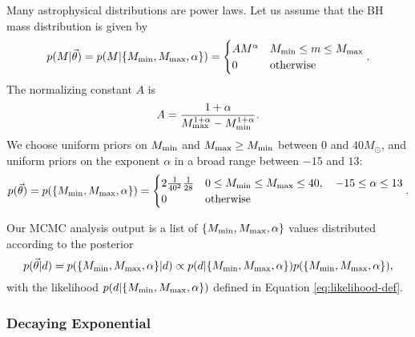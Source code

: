\documentclass[preprint]{aastex}
\newcommand{\Msun}{M_\odot}
\newcommand{\Mmin}{M_{\textnormal{min}}}
\newcommand{\Mmax}{M_{\textnormal{max}}}
\newcommand{\vtheta}{\vec{\theta}}
\begin{document}
Many astrophysical distributions are power laws.  Let us assume that
the BH mass distribution is given by
\begin{equation}
  \label{eq:power-law-dist}
  p(M|\vtheta) = p(M|\{\Mmin, \Mmax, \alpha \}) =
  \begin{cases}
    A M^\alpha & \Mmin \leq m \leq \Mmax \\
    0 & \textnormal{otherwise}
  \end{cases}.
\end{equation}
The normalizing constant $A$ is 
\begin{equation}
  A = \frac{1+\alpha}{\Mmax^{1+\alpha} - \Mmin^{1+\alpha}}.
\end{equation}
We choose uniform priors on $\Mmin$ and $\Mmax \geq \Mmin$ between 0 and
$40 \Msun$, and uniform priors on the exponent $\alpha$ in a broad
range between $-15$ and $13$:
\begin{equation}
  p(\vtheta) = p(\{\Mmin, \Mmax, \alpha\}) = 
  \begin{cases}
    2 \frac{1}{40^2}\frac{1}{28} & 0 \leq \Mmin \leq \Mmax
    \leq 40, \quad -15 \leq \alpha \leq 13 \\
    0 & \textnormal{otherwise}
  \end{cases}.
\end{equation}

Our MCMC analysis output is a list of $\{\Mmin, \Mmax, \alpha\}$
values distributed according to the posterior 
\begin{equation}
  p(\vtheta|d) = p(\{\Mmin, \Mmax, \alpha\}|d) \propto p(d|\{\Mmin,
  \Mmax, \alpha\}) p(\{\Mmin, \Mmax, \alpha\}),
\end{equation}
with the likelihood $p(d|\{\Mmin, \Mmax, \alpha\})$ defined in
Equation \eqref{eq:likelihood-def}.  

\subsubsection{Decaying Exponential}
\label{sec:exponential}
\end{document}
